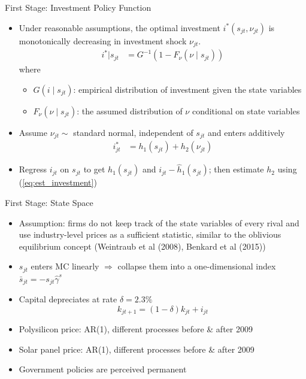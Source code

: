 \documentclass[xcolor=dvipsnames,envcountsect]{beamer}
\begin{document}
\begin{frame}{First Stage: Investment Policy Function}
\begin{itemize}
    \item Under reasonable assumptions, the optimal investment $i^*(s_{jt},\nu_{jt})$ is monotonically decreasing in investment shock $\nu_{jt}$.
        \begin{align}
        i^*|s_{jt} &= G^{-1}(1-F_{\nu}(\nu\mid s_{jt})) \label{eq:est_investment}
         \end{align}
         where 
         \begin{itemize}
             \item $G(i\mid s_{jt})$: empirical distribution of  investment given the state variables
             \item $F_{\nu}(\nu\mid s_{jt})$: the assumed distribution of $\nu$ conditional on state variables
         \end{itemize}
     \item Assume $\nu_{jt} \sim $ standard normal, independent of $s_{jt}$ and enters additively
        \begin{align}
        i_{jt}^* &= h_1(s_{jt})+h_2(\nu_{jt})
        \end{align}
     \item Regress $i_{jt}$ on $s_{jt}$ to get $h_1(s_{jt})$ and $i_{jt}-\hat h_1(s_{jt})$; then estimate $h_2$ using (\ref{eq:est_investment})
        
\end{itemize} 
\end{frame}

\begin{frame}{First Stage: State Space}
\begin{itemize}
\item Assumption: firms do not keep track of the state variables of every rival and use industry-level prices as a sufficient statistic, similar to the oblivious equilibrium concept  (Weintraub et al (2008), Benkard et al (2015))
\item $s_{jt}$  enters MC linearly $\Longrightarrow$ collapse them into a one-dimensional index $\bar s_{jt} = -s_{jt} \hat \gamma^s$
\item Capital depreciates at rate $\delta = 2.3\%$
\[
k_{jt+1}  = (1-\delta) k_{jt} + i_{jt}
\]
\item Polysilicon price: AR(1), different processes before \& after 2009
\item Solar panel price: AR(1), different processes before \& after 2009
\item Government policies are perceived permanent 
\end{itemize} 
\end{frame}
\end{document}
